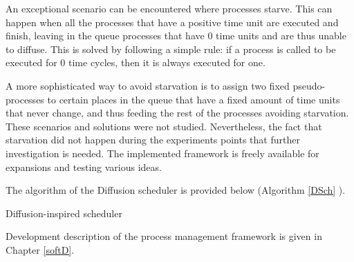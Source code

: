 An exceptional scenario can be encountered where processes starve. This can happen when all the processes that have a positive time unit are executed and finish, leaving in the queue processes that have 0 time units and are thus unable to diffuse. This is solved by following a simple rule: if a process is called to be executed for 0 time cycles, then it is always executed for one.

A more sophisticated way to avoid starvation is to assign two fixed pseudo-processes to certain places in the queue that have a fixed amount of time units that never change, and thus feeding the rest of the processes avoiding starvation. These scenarios and solutions were not studied. Nevertheless, the fact that starvation did not happen during the experiments points that further investigation is needed. The implemented framework is freely available for expansions and testing various ideas. 

The algorithm of the Diffusion scheduler is provided below (Algorithm \ref{DSch} ).

\begin{algorithm}                      
\caption{Diffusion-inspired scheduler}          
\label{DSch}                           %
\begin{algorithmic}
        \ENDIF

        \ENDIF
        \ENDIF
        \ENDIF
    
    \ENDWHILE
\end{algorithmic}
\end{algorithm}

Development description of the process management framework is given in Chapter \ref{softD}.
